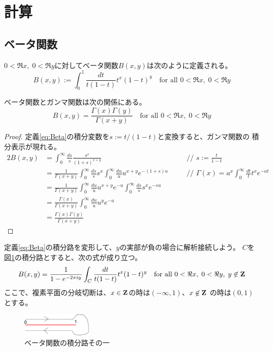 \documentclass{jsarticle}
\begin{document}
\section{計算}\label{s1:計算} %
\subsection{ベータ関数}\label{s2:ベータ関数} %
$0<\Re x,\; 0<\Re y$に対してベータ関数$B(x,y)$は次のように定義される。
\begin{equation}\label{eq:Beta}
	B(x, y) := \int_0^1\frac{dt}{t(1-t)}t^x(1-t)^y
	\quad\text{for all } 0<\Re x,\; 0<\Re y
\end{equation}

ベータ関数とガンマ関数は次の関係にある。
\begin{equation}
	B(x, y) = \frac{\Gamma(x)\Gamma(y)}{\Gamma(x+y)}
	\quad\text{for all } 0<\Re x,\; 0<\Re y
\end{equation}
\begin{proof} %
	定義\eqref{eq:Beta}の積分変数を$s:=t/(1-t)$と変換すると、ガンマ関数の
	積分表示が現れる。
	\begin{alignat*}{2}
		B(x, y) &= \int_0^\infty\frac{ds}{s}\frac{s^x}{(1+s)^{x+y}}
		&\quad&\text{// } s := \frac{t}{1-t} \\
		&= \frac{1}{\Gamma(x+y)}\int_0^\infty\frac{ds}{s}s^x
		\int_0^\infty\frac{du}{u}u^{x+y}e^{-(1+s)u}
		&\quad&\text{// } \Gamma(x) = a^x\int_0^\infty\frac{dt}{t}t^xe^{-at} \\
		&= \frac{1}{\Gamma(x+y)}\int_0^\infty\frac{du}{u}u^{x+y}e^{-u}
		\int_0^\infty\frac{ds}{s}s^xe^{-su} \\
		&= \frac{\Gamma(x)}{\Gamma(x+y)}\int_0^\infty\frac{du}{u}u^ye^{-u} \\
		&= \frac{\Gamma(x)\Gamma(y)}{\Gamma(x+y)}
	\end{alignat*}
\end{proof} %

定義\eqref{eq:Beta}の積分路を変形して、$y$の実部が負の場合に解析接続しよう。
$C$を図\ref{fig:ベータ関数の積分路その一}の積分路とすると、次の式が成り立つ。
\begin{equation*}
	B(x,y) = \frac{1}{1 - e^{-2\pi iy}}\int_C \frac{dt}{t(1 - t)}t^x(1 - t)^y
	\quad\text{for all } 0 < \Re x,\; 0 < \Re y,\; y\not\in\mathbf{Z}
\end{equation*}
ここで、複素平面の分岐切断は、$x\in\mathbf{Z}$の時は$(-\infty,1)$、$x\not\in\mathbf{Z}$
の時は$(0,1)$とする。

\begin{figure}[htbp] %
	\begin{center}
		\includegraphics[width=0.3\textwidth]{fig/contour-2.eps}
	\end{center}
	\caption{ベータ関数の積分路その一}\label{fig:ベータ関数の積分路その一}
\end{figure} %
\end{document}
